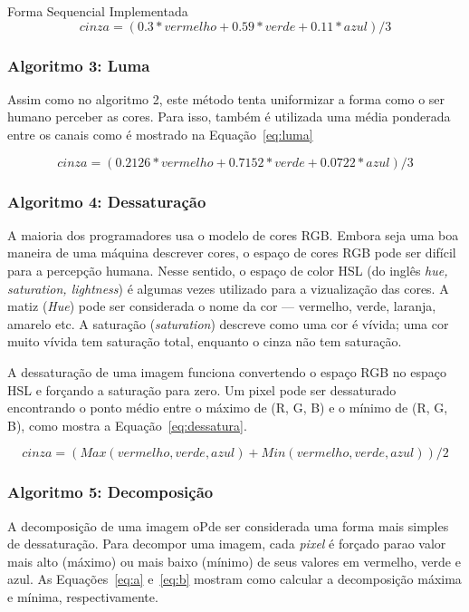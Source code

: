 \begin{subsection}{Forma Sequencial Implementada}
\begin{equation}
\label{eq:luminancia}
cinza = (0.3*vermelho + 0.59*verde + 0.11*azul)/3
\end{equation}

\subsubsection{Algoritmo 3: Luma}

Assim como no algoritmo 2, este método tenta uniformizar a forma como o ser
humano perceber as cores. Para isso, também é utilizada uma média ponderada
entre os canais como é mostrado na Equação~\ref{eq:luma}

\begin{equation}
\label{eq:luma}
cinza = (0.2126*vermelho + 0.7152*verde + 0.0722*azul)/3
\end{equation}


\subsubsection{Algoritmo 4: Dessaturação}

A maioria dos programadores usa o modelo de cores RGB. Embora seja uma boa
maneira de uma máquina descrever cores, o espaço de cores RGB pode ser difícil
para a percepção humana. Nesse sentido, o espaço de color HSL (do inglês
\textit{hue, saturation, lightness}) é algumas vezes utilizado para a
vizualização das cores. A matiz (\textit{Hue}) pode ser considerada o nome da
cor --- vermelho, verde, laranja, amarelo etc.  A saturação
(\textit{saturation}) descreve como uma cor é vívida; uma cor muito vívida tem
saturação total, enquanto o cinza não tem saturação. 

A dessaturação de uma imagem funciona convertendo o espaço RGB no espaço HSL e 
forçando a saturação para zero. Um pixel pode ser dessaturado encontrando o
ponto médio entre o máximo de (R, G, B) e o mínimo de (R, G, B), como mostra a
Equação~\ref{eq:dessatura}.

\begin{equation}
\label{eq:dessatura}
cinza = ( Max(vermelho, verde, azul) + Min(vermelho, verde, azul) ) / 2
\end{equation}



\subsubsection{Algoritmo 5: Decomposição}
A decomposição de uma imagem oPde ser considerada uma forma mais simples de
dessaturação. Para decompor uma imagem, cada \textit{pixel} é forçado parao
valor mais alto (máximo) ou mais baixo (mínimo) de seus valores em vermelho,
verde e azul. As Equações~\ref{eq:a} e~\ref{eq:b} mostram como calcular a
decomposição máxima e mínima, respectivamente.


\end{subsection}
